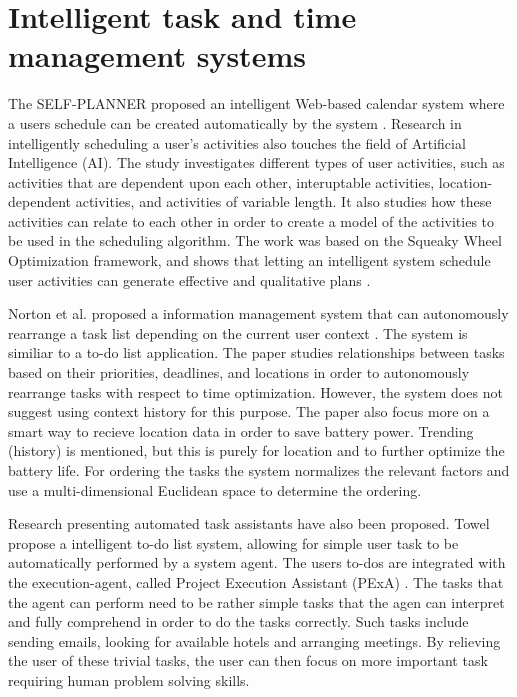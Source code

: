 \section{Intelligent task and time management systems}
The SELF-PLANNER \cite{refanidis2011deployment} proposed an intelligent Web-based calendar system where a users schedule can be created automatically by the system \cite{refanidis2010constraint}. Research in intelligently scheduling a user's activities also touches the field of Artificial Intelligence (AI). The study investigates different types of user activities, such as activities that are dependent upon each other, interuptable activities, location-dependent activities, and activities of variable length. It also studies how these activities can relate to each other in order to create a model of the activities to be used in the scheduling algorithm. The work was based on the Squeaky Wheel Optimization framework, and shows that letting an intelligent system schedule user activities can generate effective and qualitative plans \cite{refanidis2010constraint}.

Norton et al. proposed a information management system that can autonomously rearrange a task list depending on the current user context \cite{norton2010towards}. The system is similiar to a to-do list application. The paper studies relationships between tasks based on their priorities, deadlines, and locations in order to autonomously rearrange tasks with respect to time optimization. However, the system does not suggest using context history for this purpose. The paper also focus more on a smart way to recieve location data in order to save battery power. Trending (history) is mentioned, but this is purely for location and to further optimize the battery life. For ordering the tasks the system normalizes the relevant factors and use a multi-dimensional Euclidean space to determine the ordering.

Research presenting automated task assistants have also been proposed. Towel \cite{conley2007towel} propose a intelligent to-do list system, allowing for simple user task to be automatically performed by a system agent. The users to-dos are integrated with the execution-agent, called Project Execution Assistant (PExA) \cite{myers2005cognitive}. The tasks that the agent can perform need to be rather simple tasks that the agen can interpret and fully comprehend in order to do the tasks correctly. Such tasks include sending emails, looking for available hotels and arranging meetings. By relieving the user of these trivial tasks, the user can then focus on more important task requiring human problem solving skills.


